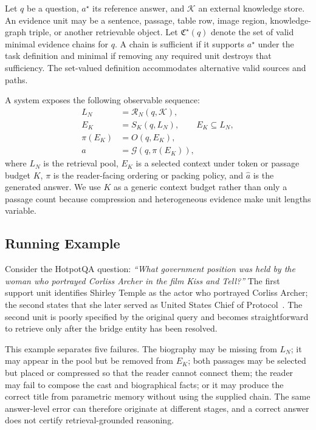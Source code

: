 \documentclass[manuscript,review]{acmart}
\newcommand{\kstore}{\ensuremath{\mathcal{K}}}
\newcommand{\retr}{\ensuremath{\mathcal{R}}}
\newcommand{\reason}{\ensuremath{\mathcal{G}}}
\newcommand{\chainset}{\ensuremath{\mathfrak{C}}}
\theoremstyle{definition}
\theoremstyle{plain}
\theoremstyle{remark}
\begin{document}
Let $q$ be a question, $a^\star$ its reference answer, and $\kstore$ an
external knowledge store. An evidence unit may be a sentence, passage, table
row, image region, knowledge-graph triple, or another retrievable object. Let
$\chainset^\star(q)$ denote the set of valid minimal evidence chains for $q$.
A chain is sufficient if it supports $a^\star$ under the task definition and
minimal if removing any required unit destroys that sufficiency. The set-valued
definition accommodates alternative valid sources and paths.

A system exposes the following observable sequence:
\begin{align}
L_N &= \retr_N(q,\kstore), \\
E_K &= S_K(q,L_N), \qquad E_K\subseteq L_N, \\
\pi(E_K) &= O(q,E_K), \\
\hat a &= \reason(q,\pi(E_K)),
\end{align}
where $L_N$ is the retrieval pool, $E_K$ is a selected context under token or
passage budget $K$, $\pi$ is the reader-facing ordering or packing policy,
and $\hat a$ is the generated answer. We use $K$ as a generic context budget rather than only a passage
count because compression and heterogeneous evidence make unit lengths
variable.

\subsection{Running Example}
\label{subsec:running_example}

Consider the HotpotQA question: \emph{``What government position was held by
the woman who portrayed Corliss Archer in the film Kiss and Tell?''}
The first support unit identifies Shirley Temple as the actor who portrayed
Corliss Archer; the second states that she later served as United States Chief
of Protocol~\cite{yang2018hotpotqa}. The second unit is poorly specified by
the original query and becomes straightforward to retrieve only after the
bridge entity has been resolved.

This example separates five failures. The biography may be missing from
$L_N$; it may appear in the pool but be removed from $E_K$; both passages may
be selected but placed or compressed so that the reader cannot connect them;
the reader may fail to compose the cast and biographical facts; or it may
produce the correct title from parametric memory without using the supplied
chain. The same answer-level error can therefore originate at different
stages, and a correct answer does not certify retrieval-grounded reasoning.
\end{document}
